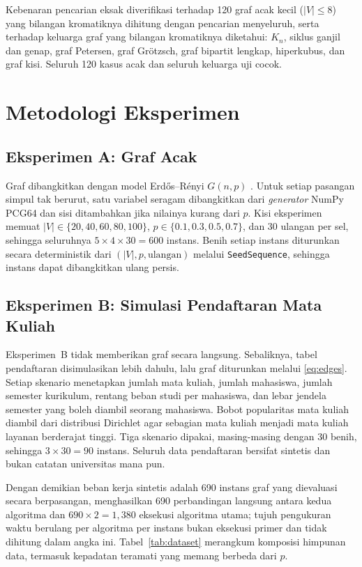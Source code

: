 \documentclass[conference,a4paper]{IEEEtran}
\begin{document}
Kebenaran pencarian eksak diverifikasi terhadap 120 graf acak kecil
($|V|\le 8$) yang bilangan kromatiknya dihitung dengan pencarian menyeluruh,
serta terhadap keluarga graf yang bilangan kromatiknya diketahui: $K_n$, siklus
ganjil dan genap, graf Petersen, graf Gr\"otzsch, graf bipartit lengkap,
hiperkubus, dan graf kisi. Seluruh 120 kasus acak dan seluruh keluarga uji
cocok.

\section{Metodologi Eksperimen}
\label{sec:method}

\subsection{Eksperimen A: Graf Acak}
Graf dibangkitkan dengan model Erd\H{o}s--R\'enyi $G(n,p)$
\cite{erdos1960evolution}. Untuk setiap pasangan simpul tak berurut, satu
variabel seragam dibangkitkan dari \emph{generator} NumPy PCG64 dan sisi
ditambahkan jika nilainya kurang dari $p$. Kisi eksperimen memuat
$|V|\in\{20,40,60,80,100\}$, $p\in\{0.1,0.3,0.5,0.7\}$, dan 30 ulangan per
sel, sehingga seluruhnya $5\times 4\times 30 = 600$ instans. Benih setiap
instans diturunkan secara deterministik dari
$(|V|,p,\text{ulangan})$ melalui \texttt{SeedSequence}, sehingga instans dapat
dibangkitkan ulang persis.

\subsection{Eksperimen B: Simulasi Pendaftaran Mata Kuliah}
Eksperimen~B tidak memberikan graf secara langsung. Sebaliknya, tabel
pendaftaran disimulasikan lebih dahulu, lalu graf diturunkan melalui
\eqref{eq:edges}. Setiap skenario menetapkan jumlah mata kuliah, jumlah
mahasiswa, jumlah semester kurikulum, rentang beban studi per mahasiswa, dan
lebar jendela semester yang boleh diambil seorang mahasiswa. Bobot popularitas
mata kuliah diambil dari distribusi Dirichlet agar sebagian mata kuliah menjadi
mata kuliah layanan berderajat tinggi. Tiga skenario dipakai, masing-masing
dengan 30 benih, sehingga $3\times 30 = 90$ instans. Seluruh data pendaftaran
bersifat sintetis dan bukan catatan universitas mana pun.

Dengan demikian beban kerja sintetis adalah 690 instans graf yang dievaluasi
secara berpasangan, menghasilkan 690 perbandingan langsung antara kedua
algoritma dan $690\times 2 = 1{,}380$ eksekusi algoritma utama; tujuh
pengukuran waktu berulang per algoritma per instans bukan eksekusi primer dan
tidak dihitung dalam angka ini. Tabel~\ref{tab:dataset} merangkum komposisi
himpunan data, termasuk kepadatan teramati yang memang berbeda dari $p$.
\end{document}

